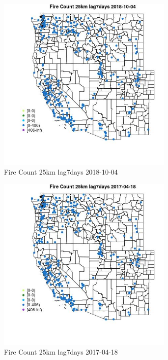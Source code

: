 \begin{figure} 
\centering  
\includegraphics[width=0.77\textwidth]{Code_Outputs/Report_ML_input_PM25_Step4_part_f_de_duplicated_aveswNAs_MapObsFire_Count_25km_lag7days2018-10-04.jpg} 
\caption{\label{fig:Report_ML_input_PM25_Step4_part_f_de_duplicated_aveswNAsMapObsFire_Count_25km_lag7days2018-10-04}Fire Count 25km lag7days 2018-10-04} 
\end{figure} 
 

\clearpage 

\begin{figure} 
\centering  
\includegraphics[width=0.77\textwidth]{Code_Outputs/Report_ML_input_PM25_Step4_part_f_de_duplicated_aveswNAs_MapObsFire_Count_25km_lag7days2017-04-18.jpg} 
\caption{\label{fig:Report_ML_input_PM25_Step4_part_f_de_duplicated_aveswNAsMapObsFire_Count_25km_lag7days2017-04-18}Fire Count 25km lag7days 2017-04-18} 
\end{figure} 
 

